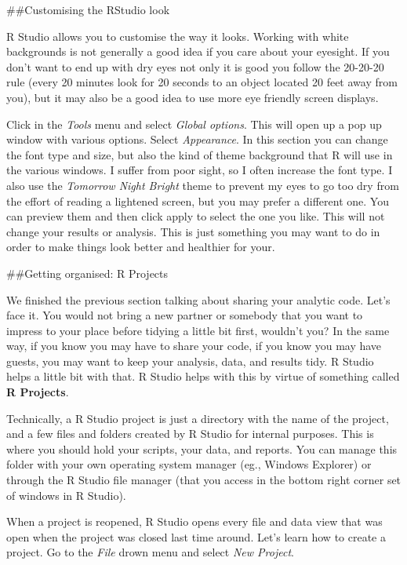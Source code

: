 \documentclass[]{book}
\theoremstyle{definition}
\theoremstyle{definition}
\theoremstyle{definition}
\theoremstyle{remark}
\begin{document}
\#\#Customising the RStudio look

R Studio allows you to customise the way it looks. Working with white
backgrounds is not generally a good idea if you care about your
eyesight. If you don't want to end up with dry eyes not only it is good
you follow the 20-20-20 rule (every 20 minutes look for 20 seconds to an
object located 20 feet away from you), but it may also be a good idea to
use more eye friendly screen displays.

Click in the \emph{Tools} menu and select \emph{Global options}. This
will open up a pop up window with various options. Select
\emph{Appearance}. In this section you can change the font type and
size, but also the kind of theme background that R will use in the
various windows. I suffer from poor sight, so I often increase the font
type. I also use the \emph{Tomorrow Night Bright} theme to prevent my
eyes to go too dry from the effort of reading a lightened screen, but
you may prefer a different one. You can preview them and then click
apply to select the one you like. This will not change your results or
analysis. This is just something you may want to do in order to make
things look better and healthier for your.

\#\#Getting organised: R Projects

We finished the previous section talking about sharing your analytic
code. Let's face it. You would not bring a new partner or somebody that
you want to impress to your place before tidying a little bit first,
wouldn't you? In the same way, if you know you may have to share your
code, if you know you may have guests, you may want to keep your
analysis, data, and results tidy. R Studio helps a little bit with that.
R Studio helps with this by virtue of something called \textbf{R
Projects}.

Technically, a R Studio project is just a directory with the name of the
project, and a few files and folders created by R Studio for internal
purposes. This is where you should hold your scripts, your data, and
reports. You can manage this folder with your own operating system
manager (eg., Windows Explorer) or through the R Studio file manager
(that you access in the bottom right corner set of windows in R Studio).

When a project is reopened, R Studio opens every file and data view that
was open when the project was closed last time around. Let's learn how
to create a project. Go to the \emph{File} drown menu and select
\emph{New Project}.
\end{document}
